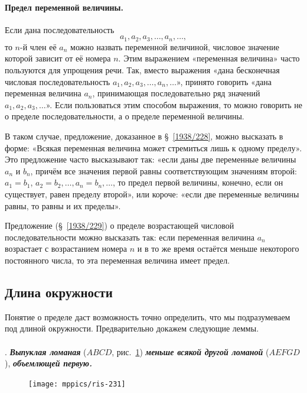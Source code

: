 \documentclass[oneside]{book}
\begin{document}
\paragraph{Предел переменной величины.}\label{1938/231}
Если дана последовательность 
\[a_1, a_2, a_3,\dots,a_n,\dots,\]
то $n$-й член её $a_n$ можно назвать переменной величиной, числовое значение которой зависит от её номера $n$.
Этим выражением «переменная величина» часто пользуются для упрощения речи.
Так, вместо выражения «дана бесконечная числовая последовательность $a_1, a_2, a_3,\dots,a_n,\dots$», принято говорить «дана переменная величина $a_n$, принимающая последовательно ряд значений $a_1, a_2, a_3,\dots$».
Если пользоваться этим способом выражения, то можно говорить не о пределе последовательности, а о пределе переменной величины.

В таком случае, предложение, доказанное в §~\ref{1938/228}, можно высказать в форме:
«Всякая переменная величина может стремиться лишь к одному пределу».
Это предложение часто высказывают так:
«если даны две переменные величины $a_n$ и $b_n$, причём все значения первой равны соответствующим значениям второй:
$a_1=b_1$,
$a_2=b_2,\dots, a_n=b_n,\dots$, то предел первой величины, конечно, если он существует, равен пределу второй», или короче:
«если две переменные величины равны, то равны и их пределы». %

Предложение (§~\ref{1938/229}) о пределе возрастающей числовой последовательности можно высказать так:
если переменная величина $a_n$ возрастает с возрастанием номера $n$ и в то же время остаётся меньше некоторого постоянного числа, то эта переменная величина имеет предел.

\subsection*{Длина окружности}

Понятие о пределе даст возможность точно определить, что мы подразумеваем под длиной окружности.
Предварительно докажем следующие леммы.

\paragraph{}\label{1938/232}
.
\textbf{\emph{Выпуклая ломаная}} ($ABCD$, рис.~\ref{1938/ris-231}) \textbf{\emph{меньше всякой другой ломаной}} ($AEFGD$), \textbf{\emph{объемлющей первую.}}

\begin{figure}
\centering
\texttt{[image: mppics/ris-231]}
\caption{}\label{1938/ris-231}
\end{figure}
\end{document}
